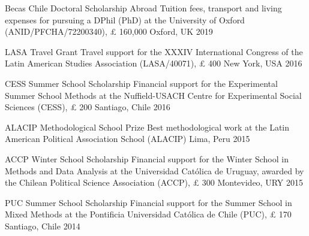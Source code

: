 \begin{cvhonors}
\cvhonor
{Becas Chile Doctoral Scholarship Abroad} 
{Tuition fees, transport and living expenses for pursuing a DPhil (PhD) at the University of Oxford (ANID/PFCHA/72200340), {\pounds} 160,000}
{Oxford, UK}
{2019}
\end{cvhonors}

\vspace{1mm}

\begin{cvhonors}
\cvhonor
{LASA Travel Grant} 
{Travel support for the XXXIV International Congress of the Latin American Studies Association (LASA/40071), {\pounds} 400}
{New York, USA}
{2016}
\end{cvhonors}

\vspace{1mm}

\begin{cvhonors}
\cvhonor
{CESS Summer School Scholarship}
{Financial support for the Experimental Summer School Methods at the Nuffield-USACH Centre for Experimental Social Sciences (CESS), {\pounds} 200}
{Santiago, Chile}
{2016}
\end{cvhonors}

\vspace{1mm}

\begin{cvhonors}
\cvhonor
{ALACIP Methodological School Prize}
{Best methodological work at the Latin American Political Association School (ALACIP)}
{Lima, Peru}
{2015}
\end{cvhonors}

\vspace{1mm}

\begin{cvhonors}
\cvhonor
{ACCP Winter School Scholarship}
{Financial support for the Winter School in Methods and Data Analysis at the Universidad Cat\'olica de Uruguay, awarded by the Chilean Political Science Association (ACCP), {\pounds} 300}
{Montevideo, URY}
{ 2015}
\end{cvhonors}

\vspace{1mm}

\begin{cvhonors}
\cvhonor
{PUC Summer School Scholarship}
{Financial support for the Summer School in Mixed Methods at the Pontificia Universidad Cat\'olica de Chile (PUC), {\pounds} 170}
{Santiago, Chile}
{2014} 
\end{cvhonors}

\vspace{1mm}

